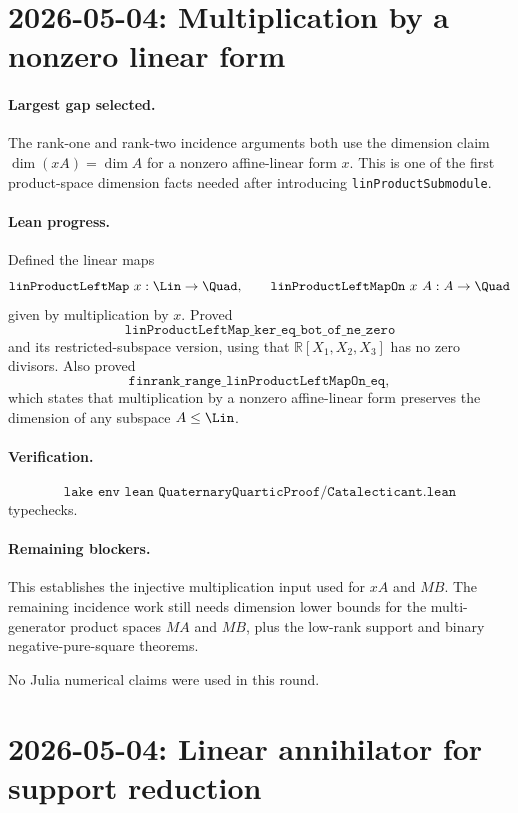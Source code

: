 \documentclass[11pt]{article}
\begin{document}
\section*{2026-05-04: Multiplication by a nonzero linear form}

\paragraph{Largest gap selected.}
The rank-one and rank-two incidence arguments both use the dimension claim
\(\dim(xA)=\dim A\) for a nonzero affine-linear form \(x\).  This is one of
the first product-space dimension facts needed after introducing
\texttt{linProductSubmodule}.

\paragraph{Lean progress.}
Defined the linear maps
\[
\texttt{linProductLeftMap}\ x:\Lin\to\Quad,\qquad
\texttt{linProductLeftMapOn}\ x\ A:A\to\Quad
\]
given by multiplication by \(x\).  Proved
\[
\texttt{linProductLeftMap\_ker\_eq\_bot\_of\_ne\_zero}
\]
and its restricted-subspace version, using that
\(\mathbb R[X_1,X_2,X_3]\) has no zero divisors.  Also proved
\[
\texttt{finrank\_range\_linProductLeftMapOn\_eq},
\]
which states that multiplication by a nonzero affine-linear form preserves
the dimension of any subspace \(A\le\Lin\).

\paragraph{Verification.}
\[
\texttt{lake env lean QuaternaryQuarticProof/Catalecticant.lean}
\]
typechecks.

\paragraph{Remaining blockers.}
This establishes the injective multiplication input used for \(xA\) and
\(MB\).  The remaining incidence work still needs dimension lower bounds for
the multi-generator product spaces \(MA\) and \(MB\), plus the low-rank support
and binary negative-pure-square theorems.

No Julia numerical claims were used in this round.

\section*{2026-05-04: Linear annihilator for support reduction}
\end{document}
